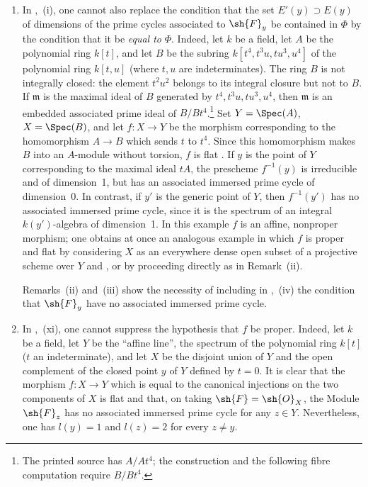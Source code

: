 \begin{remarks}[12.2.3]
\begin{enumerate}[label=(\roman*)]
  \item In ,~(i), one cannot also replace the condition that the set $E'(y)\supset E(y)$ of dimensions of the prime cycles associated to $\sh{F}_y$ be contained in $\Phi$ by the condition that it be \emph{equal to} $\Phi$.
Indeed, let $k$ be a field, let $A$ be the polynomial ring $k[t]$, and let $B$ be the subring $k[t^4,t^3u,tu^3,u^4]$ of the polynomial ring $k[t,u]$ (where $t,u$ are indeterminates). The ring $B$ is not integrally closed: the element $t^2u^2$ belongs to its integral closure but not to $B$. If $\mathfrak{m}$ is the maximal ideal of $B$ generated by $t^4,t^3u,tu^3,u^4$, then $\mathfrak{m}$ is an embedded associated prime ideal of $B/Bt^4$.\footnote{The printed source has $A/At^4$; the construction and the following fibre computation require $B/Bt^4$.}
Set $Y=\Spec(A)$, $X=\Spec(B)$, and let $f:X\to Y$ be the morphism corresponding to the homomorphism $A\to B$ which sends $t$ to $t^4$.
Since this homomorphism makes $B$ into an $A$-module without torsion, $f$ is flat .
If $y$ is the point of $Y$ corresponding to the maximal ideal $tA$, the prescheme $f^{-1}(y)$ is irreducible and of dimension~1, but has an associated immersed prime cycle of dimension~0. In contrast, if $y'$ is the generic point of $Y$, then $f^{-1}(y')$ has no associated immersed prime cycle, since it is the spectrum of an integral $k(y')$-algebra of dimension~1. In this example $f$ is an affine, nonproper morphism; one obtains at once an analogous example in which $f$ is proper and flat by considering $X$ as an everywhere dense open subset of a projective scheme over $Y$  and , or by proceeding directly as in Remark~(ii).

Remarks~(ii) and~(iii) show the necessity of including in ,~(iv) the condition that $\sh{F}_y$ have no associated immersed prime cycle.

  \item In ,~(xi), one cannot suppress the hypothesis that $f$ be proper.
Indeed, let $k$ be a field, let $Y$ be the ``affine line'', the spectrum of the polynomial ring $k[t]$ ($t$ an indeterminate), and let $X$ be the disjoint union of $Y$ and the open complement of the closed point $y$ of $Y$ defined by $t=0$. It is clear that the morphism $f:X\to Y$ which is equal to the canonical injections on the two components of $X$ is flat and that, on taking $\sh{F}=\sh{O}_X$, the Module $\sh{F}_z$ has no associated immersed prime cycle for any $z\in Y$. Nevertheless, one has $l(y)=1$ and $l(z)=2$ for every $z\neq y$.


\end{enumerate}
\end{remarks}
